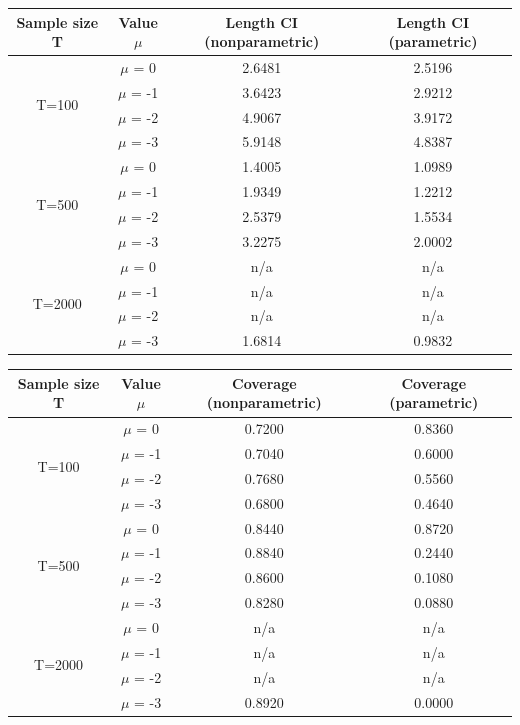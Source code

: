 \documentclass[12pt]{article}
\begin{document}
\begin{center}
\begin{tabular}{||c | c | c c||} 
 \hline
 Sample size T & Value $\mu$ & Length CI (nonparametric) & Length CI (parametric) \\ [0.5ex] 
 \hline\hline
 \multirow{4}{4em}{T=100} & $\mu$ = 0 & 2.6481 & 2.5196\\ 
& $\mu$ = -1 & 3.6423 & 2.9212 \\ 
& $\mu$ = -2 & 4.9067 & 3.9172 \\ 
& $\mu$ = -3 & 5.9148 & 4.8387 \\ 
 \hline
 \multirow{4}{4em}{T=500} & $\mu$ = 0 & 1.4005 & 1.0989\\ 
& $\mu$ = -1 & 1.9349 & 1.2212 \\ 
& $\mu$ = -2 & 2.5379 & 1.5534 \\ 
& $\mu$ = -3 & 3.2275 & 2.0002 \\ 
 \hline
 \multirow{4}{4em}{T=2000} & $\mu$ = 0 & n/a & n/a\\ 
& $\mu$ = -1 & n/a & n/a \\ 
& $\mu$ = -2 & n/a & n/a \\ 
& $\mu$ = -3 & 1.6814 & 0.9832 \\ 
 \hline
\end{tabular}
\end{center}

\begin{center}
\begin{tabular}{||c | c | c c||} 
 \hline
 Sample size T & Value $\mu$ & Coverage (nonparametric) & Coverage (parametric) \\ [0.5ex] 
 \hline\hline
 \multirow{4}{4em}{T=100} & $\mu$ = 0 & 0.7200 & 0.8360\\ 
& $\mu$ = -1 & 0.7040 & 0.6000 \\ 
& $\mu$ = -2 & 0.7680 & 0.5560 \\ 
& $\mu$ = -3 & 0.6800 & 0.4640 \\ 
 \hline
 \multirow{4}{4em}{T=500} & $\mu$ = 0 & 0.8440 & 0.8720\\ 
& $\mu$ = -1 & 0.8840 & 0.2440 \\ 
& $\mu$ = -2 & 0.8600 & 0.1080 \\ 
& $\mu$ = -3 & 0.8280 & 0.0880 \\ 
 \hline
 \multirow{4}{4em}{T=2000} & $\mu$ = 0 & n/a & n/a\\ 
& $\mu$ = -1 & n/a & n/a \\ 
& $\mu$ = -2 & n/a & n/a \\ 
& $\mu$ = -3 & 0.8920 & 0.0000 \\ 
 \hline
\end{tabular}
\end{center}
\end{document}
